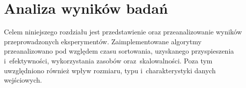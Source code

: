 \cleardoublepage
\chapter{Analiza wyników badań}
\label{cha:AnalizaBadan}

Celem niniejszego rozdziału jest przedstawienie oraz przeanalizowanie wyników przeprowadzonych eksperymentów. 
Zaimplementowane algorytmy przeanalizowano pod względem czasu sortowania, uzyskanego przyspieszenia i~efektywności, 
wykorzystania zasobów oraz~skalowalności. 
Poza tym uwzględniono również wpływ rozmiaru, typu i~charakterystyki danych wejściowych.









